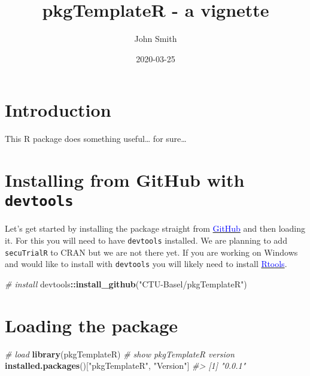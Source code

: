 \documentclass[]{article}
\title{pkgTemplateR - a vignette}
\author{John Smith}
\date{2020-03-25}
\newenvironment{Shaded}{\begin{snugshade}}{\end{snugshade}}
\newcommand{\CommentTok}[1]{\textcolor[rgb]{0.56,0.35,0.01}{\textit{#1}}}
\newcommand{\KeywordTok}[1]{\textcolor[rgb]{0.13,0.29,0.53}{\textbf{#1}}}
\newcommand{\NormalTok}[1]{#1}
\newcommand{\OperatorTok}[1]{\textcolor[rgb]{0.81,0.36,0.00}{\textbf{#1}}}
\newcommand{\StringTok}[1]{\textcolor[rgb]{0.31,0.60,0.02}{#1}}
\begin{document}
\maketitle

{
\setcounter{tocdepth}{3}
\tableofcontents
}
\newpage

\hypertarget{introduction}{%
\section{Introduction}\label{introduction}}

This R package does something useful\ldots{} for sure\ldots{}

\hypertarget{installing-from-github-with-devtools}{%
\section{\texorpdfstring{Installing from GitHub with
\texttt{devtools}}{Installing from GitHub with devtools}}\label{installing-from-github-with-devtools}}

Let's get started by installing the package straight from
\href{https://github.com/SwissClinicalTrialOrganisation/secuTrialR}{\textcolor{blue}{GitHub}}
and then loading it. For this you will need to have \texttt{devtools}
installed. We are planning to add \texttt{secuTrialR} to CRAN but we are
not there yet. If you are working on Windows and would like to install
with \texttt{devtools} you will likely need to install
\href{https://cran.r-project.org/bin/windows/Rtools/}{\textcolor{blue}{Rtools}}.

\vspace{5pt}

\begin{Shaded}
\begin{Highlighting}[]
\CommentTok{# install}
\NormalTok{devtools}\OperatorTok{::}\KeywordTok{install_github}\NormalTok{(}\StringTok{"CTU-Basel/pkgTemplateR"}\NormalTok{)}
\end{Highlighting}
\end{Shaded}

\hypertarget{loading-the-package}{%
\section{Loading the package}\label{loading-the-package}}

\begin{Shaded}
\begin{Highlighting}[]
\CommentTok{# load}
\KeywordTok{library}\NormalTok{(pkgTemplateR)}
\CommentTok{# show pkgTemplateR version}
\KeywordTok{installed.packages}\NormalTok{()[}\StringTok{"pkgTemplateR"}\NormalTok{, }\StringTok{"Version"}\NormalTok{]}
\CommentTok{#> [1] "0.0.1"}
\end{Highlighting}
\end{Shaded}
\end{document}

